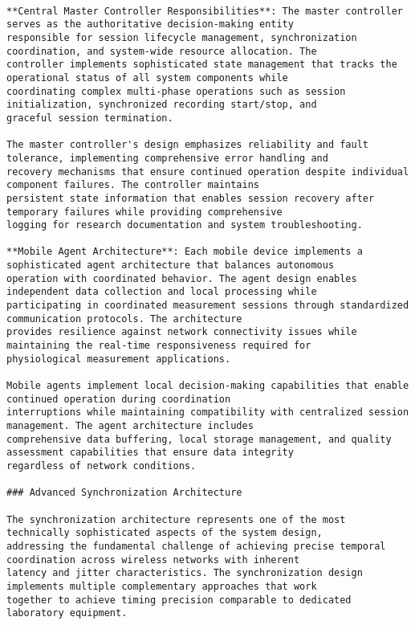 \documentclass[11pt,a4paper]{report}
\begin{document}
\begin{verbatim}

**Central Master Controller Responsibilities**: The master controller serves as the authoritative decision-making entity
responsible for session lifecycle management, synchronization coordination, and system-wide resource allocation. The
controller implements sophisticated state management that tracks the operational status of all system components while
coordinating complex multi-phase operations such as session initialization, synchronized recording start/stop, and
graceful session termination.

The master controller's design emphasizes reliability and fault tolerance, implementing comprehensive error handling and
recovery mechanisms that ensure continued operation despite individual component failures. The controller maintains
persistent state information that enables session recovery after temporary failures while providing comprehensive
logging for research documentation and system troubleshooting.

**Mobile Agent Architecture**: Each mobile device implements a sophisticated agent architecture that balances autonomous
operation with coordinated behavior. The agent design enables independent data collection and local processing while
participating in coordinated measurement sessions through standardized communication protocols. The architecture
provides resilience against network connectivity issues while maintaining the real-time responsiveness required for
physiological measurement applications.

Mobile agents implement local decision-making capabilities that enable continued operation during coordination
interruptions while maintaining compatibility with centralized session management. The agent architecture includes
comprehensive data buffering, local storage management, and quality assessment capabilities that ensure data integrity
regardless of network conditions.

### Advanced Synchronization Architecture

The synchronization architecture represents one of the most technically sophisticated aspects of the system design,
addressing the fundamental challenge of achieving precise temporal coordination across wireless networks with inherent
latency and jitter characteristics. The synchronization design implements multiple complementary approaches that work
together to achieve timing precision comparable to dedicated laboratory equipment.


\end{verbatim}
\end{document}
